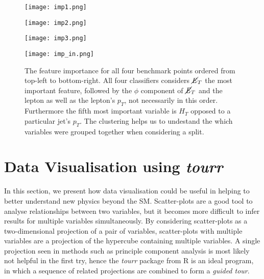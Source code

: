 \begin{figure}[htbp]
\centering
  \begin{minipage}[htbp]{0.49\textwidth}
    \centering
    \texttt{[image: imp1.png]}
  \end{minipage}
  \hfill
  \begin{minipage}[htbp]{0.49\textwidth}
    \centering
    \texttt{[image: imp2.png]}
  \end{minipage}
  \hfill
  \begin{minipage}[htbp]{0.49\textwidth}
    \centering
    \texttt{[image: imp3.png]}
  \end{minipage}
  \hfill
  \begin{minipage}[htbp]{0.49\textwidth}
    \centering
    \texttt{[image: imp\_in.png]}
  \end{minipage}
  \caption{The feature importance for all four benchmark points ordered from top-left to bottom-right. All four classifiers considers $\cancel{\it{E}}_{T}$ the most important feature, followed by the $\phi$ component of $\cancel{\it{E}}_{T}$ and the lepton as well as the lepton's $p_T$, not necessarily in this order. Furthermore the fifth most important variable is $H_T$ opposed to a particular jet's $p_T$. The clustering helps us to undestand the which variables were grouped together when considering a split.}
  \label{fig:imps}
\end{figure}

\section{Data Visualisation using \textit{tourr}}
In this section, we present how data visualisation could be useful in helping to better understand new physics beyond the SM. Scatter-plots are a good tool to analyse relationships between two variables, but it becomes more difficult to infer results for multiple variables simultaneously. By considering scatter-plots as a two-dimensional projection of a pair of variables, scatter-plots with multiple variables are a projection of the hypercube containing multiple variables. A single projection seen in methods such as principle component analysis is most likely not helpful in the first try, hence the \textit{tourr} package from R \cite{tourr} is an ideal program, in which a sequence of related projections are combined to form a \textit{guided tour}. \\

